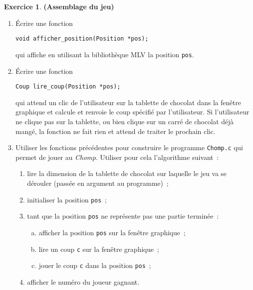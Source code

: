\documentclass[12pt]{article}
\theoremstyle{definition}
\newtheorem{Exercice}{Exercice}
\begin{document}
\begin{Exercice} {\bf (Assemblage du jeu)}\smallskip
\label{ex:3}

    \begin{enumerate}
        \item Écrire une fonction
\begin{lstlisting}
void afficher_position(Position *pos);
\end{lstlisting}
        qui affiche en utilisant la bibliothèque {\sf MLV} la position {\tt pos}.
        \smallskip

        \item Écrire une fonction
\begin{lstlisting}
Coup lire_coup(Position *pos);
\end{lstlisting}
        qui attend un clic de l'utilisateur sur la tablette de chocolat
        dans la fenêtre graphique et calcule et renvoie le coup spécifié
        par l'utilisateur. Si l'utilisateur ne clique pas sur la tablette,
        ou bien clique sur un carré de chocolat déjà mangé, la fonction
        ne fait rien et attend de traiter le prochain clic.
        \smallskip

        \item Utiliser les fonctions précédentes pour construire le
        programme {\tt Chomp.c} qui permet de jouer au {\em Chomp}.
        Utiliser pour cela l'algorithme suivant~:
        \smallskip

        \begin{enumerate}[(1)]
            \item lire la dimension de la tablette de chocolat sur
            laquelle le jeu va se dérouler (passée en argument au programme)~;
            \item initialiser la position {\tt pos}~;
            \item tant que la position {\tt pos} ne représente pas une
            partie terminée~:
            \begin{enumerate}[(a)]
                \item afficher la position {\tt pos} sur la
                fenêtre graphique~;
                \item lire un coup {\tt c} sur la fenêtre graphique~;
                \item jouer le coup {\tt c} dans la position {\tt pos}~;
            \end{enumerate}
            \item afficher le numéro du joueur gagnant.
        \end{enumerate}
    \end{enumerate}
\end{Exercice}
\bigskip
\end{document}
